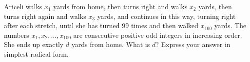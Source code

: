 Ariceli walks $x_1$ yards from home, then turns right and walks $x_2$ yards, then turns right again and walks $x_3$ yards, and continues in this way, turning right after each stretch, until she has turned $99$ times and then walked $x_{100}$ yards. The numbers $x_1,x_2,\dots,x_{100}$ are consecutive positive odd integers in increasing order. She ends up exactly $d$ yards from home. What is $d$? Express your answer in simplest radical form.
